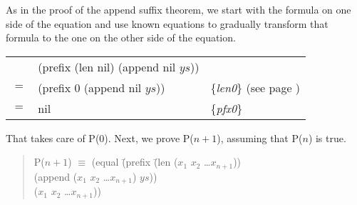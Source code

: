 As in the proof of the append suffix theorem, we start with the formula on one side of the equation and use known equations to gradually transform that formula to the one on the other side of the equation.

\begin{center}
\begin{tabular}{lll}
    & (prefix (len nil) (append nil $ys$))  &                                                      \\
$=$ & (prefix 0 (append nil $ys$))          & \{\emph{len0}\} (see page \pageref{len-equations})   \\
$=$ & nil                                   & \{\emph{pfx0}\}                                      \\
\end{tabular}
\end{center}

That takes care of P(0). Next, we prove P($n+1$), assuming that P($n$) is true.

\begin{quote}
\begin{tabbing}
P($n+1$) $\equiv$ (equal \=(prefix \=(len ($x_1$ $x_2$ \dots $x_{n+1}$))        \\
                       \>        \>(append ($x_1$ $x_2$ \dots $x_{n+1}$) $ys$)) \\
                       \>($x_1$ $x_2$ \dots $x_{n+1}$))                         \\
\end{tabbing}
\end{quote}


